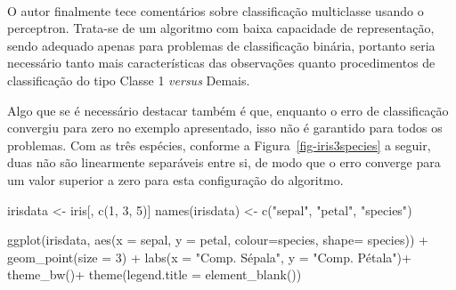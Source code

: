 \documentclass[
  a4paperpaper,
]{article}
\newenvironment{Shaded}{\begin{snugshade}}{\end{snugshade}}
\newcommand{\AttributeTok}[1]{\textcolor[rgb]{0.40,0.45,0.13}{#1}}
\newcommand{\DecValTok}[1]{\textcolor[rgb]{0.68,0.00,0.00}{#1}}
\newcommand{\FunctionTok}[1]{\textcolor[rgb]{0.28,0.35,0.67}{#1}}
\newcommand{\NormalTok}[1]{\textcolor[rgb]{0.00,0.23,0.31}{#1}}
\newcommand{\OtherTok}[1]{\textcolor[rgb]{0.00,0.23,0.31}{#1}}
\newcommand{\SpecialCharTok}[1]{\textcolor[rgb]{0.37,0.37,0.37}{#1}}
\newcommand{\StringTok}[1]{\textcolor[rgb]{0.13,0.47,0.30}{#1}}
\begin{document}
~

O autor finalmente tece comentários sobre classificação multiclasse
usando o perceptron. Trata-se de um algoritmo com baixa capacidade de
representação, sendo adequado apenas para problemas de classificação
binária, portanto seria necessário tanto mais características das
observações quanto procedimentos de classificação do tipo Classe 1
\emph{versus} Demais.

Algo que se é necessário destacar também é que, enquanto o erro de
classificação convergiu para zero no exemplo apresentado, isso não é
garantido para todos os problemas. Com as três espécies, conforme a
Figura~\ref{fig-iris3species} a seguir, duas não são linearmente
separáveis entre si, de modo que o erro converge para um valor superior
a zero para esta configuração do algoritmo.

\begin{Shaded}
\begin{Highlighting}[]
\NormalTok{irisdata }\OtherTok{\textless{}{-}}\NormalTok{ iris[, }\FunctionTok{c}\NormalTok{(}\DecValTok{1}\NormalTok{, }\DecValTok{3}\NormalTok{, }\DecValTok{5}\NormalTok{)]}
\FunctionTok{names}\NormalTok{(irisdata) }\OtherTok{\textless{}{-}} \FunctionTok{c}\NormalTok{(}\StringTok{"sepal"}\NormalTok{, }\StringTok{"petal"}\NormalTok{, }\StringTok{"species"}\NormalTok{)}

\FunctionTok{ggplot}\NormalTok{(irisdata, }\FunctionTok{aes}\NormalTok{(}\AttributeTok{x =}\NormalTok{ sepal, }\AttributeTok{y =}\NormalTok{ petal,}
                      \AttributeTok{colour=}\NormalTok{species, }\AttributeTok{shape=}\NormalTok{ species)) }\SpecialCharTok{+} 
        \FunctionTok{geom\_point}\NormalTok{(}\AttributeTok{size =} \DecValTok{3}\NormalTok{) }\SpecialCharTok{+}
        \FunctionTok{labs}\NormalTok{(}\AttributeTok{x =} \StringTok{"Comp. Sépala"}\NormalTok{, }\AttributeTok{y =} \StringTok{"Comp. Pétala"}\NormalTok{)}\SpecialCharTok{+}
  \FunctionTok{theme\_bw}\NormalTok{()}\SpecialCharTok{+}
  \FunctionTok{theme}\NormalTok{(}\AttributeTok{legend.title =} \FunctionTok{element\_blank}\NormalTok{())}
\end{Highlighting}
\end{Shaded}
\end{document}

